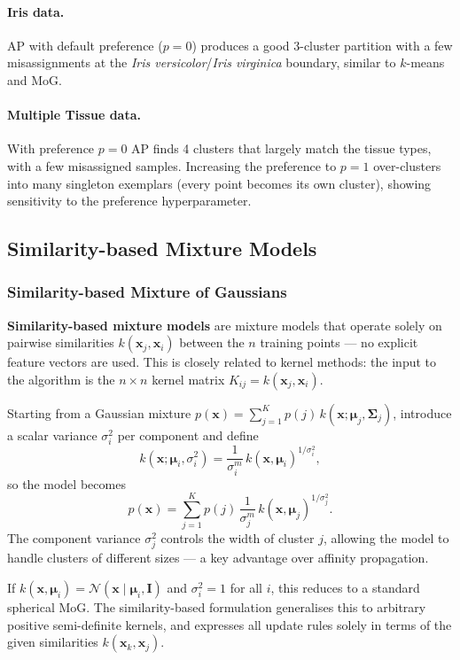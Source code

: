 \documentclass[11pt, oneside]{book}
\begin{document}
\paragraph{Iris data.}
AP with default preference ($p=0$) produces a good 3-cluster partition with
a few misassignments at the \emph{Iris versicolor}/\emph{Iris virginica}
boundary, similar to $k$-means and MoG.

\paragraph{Multiple Tissue data.}
With preference $p=0$ AP finds 4 clusters that largely match the tissue types,
with a few misassigned samples.
Increasing the preference to $p=1$ over-clusters into many singleton exemplars
(every point becomes its own cluster), showing sensitivity to the preference
hyperparameter.

\subsection{Similarity-based Mixture Models}

\subsubsection{Similarity-based Mixture of Gaussians}

\textbf{Similarity-based mixture models} are mixture models that operate
solely on pairwise similarities $k(\bm{x}_j, \bm{x}_i)$ between the $n$
training points — no explicit feature vectors are used.
This is closely related to kernel methods: the input to the algorithm is the
$n\times n$ kernel matrix $K_{ij} = k(\bm{x}_j, \bm{x}_i)$.

Starting from a Gaussian mixture
$p(\bm{x}) = \sum_{j=1}^{K} p(j)\,k(\bm{x};\bm{\mu}_j,\bm{\Sigma}_j)$,
introduce a scalar variance $\sigma_i^2$ per component and define
\[
  k(\bm{x};\bm{\mu}_i,\sigma_i^2) = \frac{1}{\sigma_i^m}\,k(\bm{x},\bm{\mu}_i)^{1/\sigma_i^2},
\]
so the model becomes
\[
  p(\bm{x}) = \sum_{j=1}^{K} p(j)\,\frac{1}{\sigma_j^m}\,k(\bm{x},\bm{\mu}_j)^{1/\sigma_j^2}.
\]
The component variance $\sigma_j^2$ controls the width of cluster $j$,
allowing the model to handle clusters of different sizes — a key advantage
over affinity propagation.

\begin{intbox}[title={Connection to standard MoG}]
If $k(\bm{x},\bm{\mu}_i) = \mathcal{N}(\bm{x}\mid\bm{\mu}_i,\bm{I})$ and
$\sigma_i^2=1$ for all $i$, this reduces to a standard spherical MoG.
The similarity-based formulation generalises this to arbitrary positive
semi-definite kernels, and expresses all update rules solely in terms of
the given similarities $k(\bm{x}_k,\bm{x}_j)$.
\end{intbox}
\end{document}
